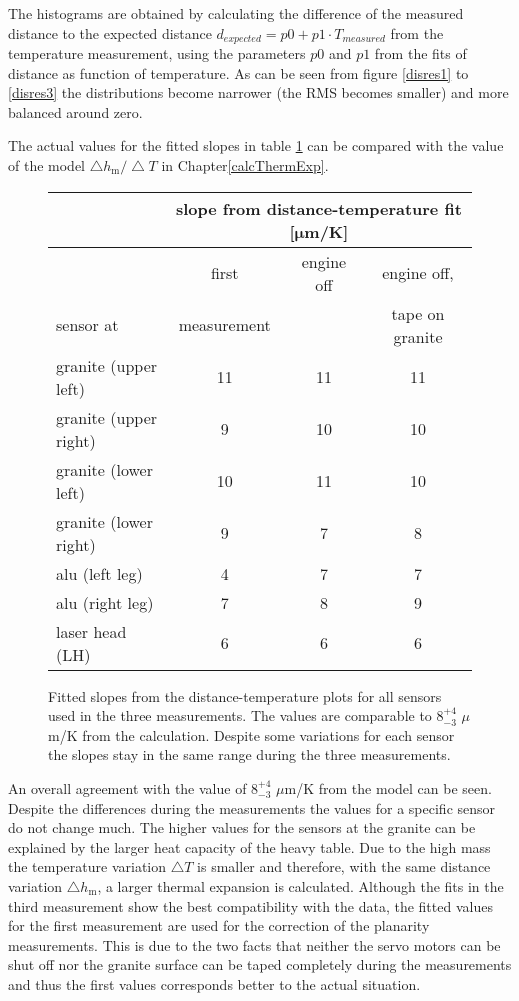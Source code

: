 \documentclass[
a4paper,                                %
twoside,                                %
BCOR1.4cm,                      %
10pt,                           %
headings=normal,                %
headsepline,                    %
clearplainpage, %
final,                                  %
div=14,
parskip=full,
openright,
bibliography=toc
]{scrreprt}
\begin{document}
The histograms are obtained by calculating the difference of the measured distance to the expected distance $ d_{expected} = p0 + p1 \cdot T_{measured} $ from the temperature measurement, using the parameters $ p0 $ and $ p1 $ from the fits of distance as function of temperature. As can be seen from figure \ref{disres1} to \ref{disres3} the distributions become narrower (the RMS becomes smaller) and more balanced around zero. 

The actual values for the fitted slopes in table \ref{slopetable} can be compared with the value of the model  $\bigtriangleup\!h_{\mathrm{m}}/\bigtriangleup\!T$ in Chapter\ref{calcThermExp}.

\begin{figure}[H]
	\centering
	\begin{tabular}{l|ccc} 
		 & \multicolumn{3}{c}{ \textbf{slope from distance-temperature fit [$\boldsymbol{\mu}$m/K]} }
		\\
		\hline
		 & first & engine off & engine off,
		\\
		\cline{1-1}
		sensor at & measurement &  & tape on granite
		\\
		\hline
		granite (upper left) & 11 & 11 & 11
		\\
		granite (upper right) & 9 & 10 & 10
		\\
		granite (lower left) & 10 & 11 & 10
		\\
		granite (lower right) & 9 & 7 & 8
		\\
		alu (left leg) & 4 & 7 & 7
		\\
		alu (right leg) & 7 & 8 & 9
		\\
		laser head (LH) & 6 & 6 & 6
	\end{tabular}
	\caption{Fitted slopes from the distance-temperature plots for all sensors used in the three measurements. The values are comparable to $8_{-3}^{+4}$ $\mu$m/K from the calculation. Despite some variations for each sensor the slopes stay in the same range during the three measurements.}
	\label{slopetable}
\end{figure}

An overall agreement with the value of $8_{-3}^{+4}$ $\mu$m/K from the model can be seen. Despite the differences during the measurements the values for a specific sensor do not change much. The higher values for the sensors at the granite can be explained by the larger heat capacity of the heavy table. Due to the high mass the temperature variation $\bigtriangleup\!T$ is smaller and therefore, with the same distance variation $\bigtriangleup\!h_{\mathrm{m}}$, a larger thermal expansion is calculated. Although the fits in the third measurement show the best compatibility with the data, the fitted values for the first measurement are used for the correction of the planarity measurements. This is due to the two facts that neither the servo motors can be shut off nor the granite surface can be taped completely during the measurements and thus the first values corresponds better to the actual situation.
\end{document}
